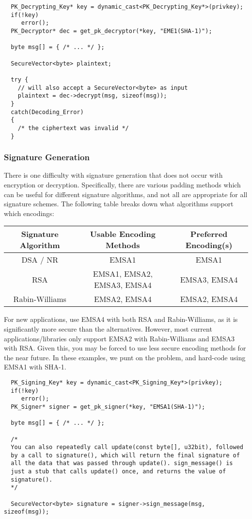 \documentclass{article}
\begin{document}
\begin{verbatim}
  PK_Decrypting_Key* key = dynamic_cast<PK_Decrypting_Key*>(privkey);
  if(!key)
     error();
  PK_Decryptor* dec = get_pk_decryptor(*key, "EME1(SHA-1)");

  byte msg[] = { /* ... */ };

  SecureVector<byte> plaintext;

  try {
    // will also accept a SecureVector<byte> as input
    plaintext = dec->decrypt(msg, sizeof(msg));
  }
  catch(Decoding_Error)
  {
    /* the ciphertext was invalid */
  }
\end{verbatim}

\subsubsection{Signature Generation}

There is one difficulty with signature generation that does not occur with
encryption or decryption. Specifically, there are various padding methods which
can be useful for different signature algorithms, and not all are appropriate
for all signature schemes. The following table breaks down what algorithms
support which encodings:

\begin{tabular}{|c|c|c|} \hline
Signature Algorithm & Usable Encoding Methods & Preferred Encoding(s) \\ \hline
DSA / NR            & EMSA1                   & EMSA1 \\ \hline
RSA                 & EMSA1, EMSA2, EMSA3, EMSA4 & EMSA3, EMSA4 \\ \hline
Rabin-Williams      & EMSA2, EMSA4            & EMSA2, EMSA4 \\ \hline
\end{tabular}

For new applications, use EMSA4 with both RSA and Rabin-Williams, as it is
significantly more secure than the alternatives. However, most current
applications/libraries only support EMSA2 with Rabin-Williams and EMSA3 with
RSA. Given this, you may be forced to use less secure encoding methods for the
near future. In these examples, we punt on the problem, and hard-code using
EMSA1 with SHA-1.

\begin{verbatim}
  PK_Signing_Key* key = dynamic_cast<PK_Signing_Key*>(privkey);
  if(!key)
     error();
  PK_Signer* signer = get_pk_signer(*key, "EMSA1(SHA-1)");

  byte msg[] = { /* ... */ };

  /*
  You can also repeatedly call update(const byte[], u32bit), followed
  by a call to signature(), which will return the final signature of
  all the data that was passed through update(). sign_message() is
  just a stub that calls update() once, and returns the value of
  signature().
  */

  SecureVector<byte> signature = signer->sign_message(msg, sizeof(msg));
\end{verbatim}
\end{document}
